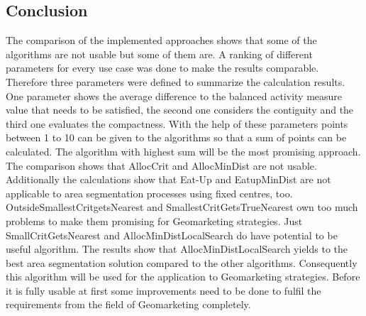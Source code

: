 \subsection{Conclusion}
The comparison of the implemented approaches shows that some of the algorithms are not usable but some of them are. A ranking of different parameters for every use case was done to make the results comparable. Therefore three parameters were defined to summarize the calculation results. One parameter shows the average difference to the balanced activity measure value that needs to be satisfied, the second one considers the contiguity and the third one evaluates the compactness. With the help of these parameters points between 1 to 10 can be given to the algorithms so that a sum of points can be calculated. The algorithm with highest sum will be the most promising approach. The comparison shows that AllocCrit and AllocMinDist are not usable. Additionally the calculations show that Eat-Up and EatupMinDist are not applicable to area segmentation processes using fixed centres, too. OutsideSmallestCritgetsNearest and SmallestCritGetsTrueNearest own too much problems to make them promising for Geomarketing strategies. Just SmallCritGetsNearest and AllocMinDistLocalSearch do have potential to be useful algorithm. The results show that AllocMinDistLocalSearch yields to the best area segmentation solution compared to the other algorithms. Consequently this algorithm will be used for the application to Geomarketing strategies. Before it is fully usable at first some improvements need to be done to fulfil the requirements from the field of Geomarketing completely.
